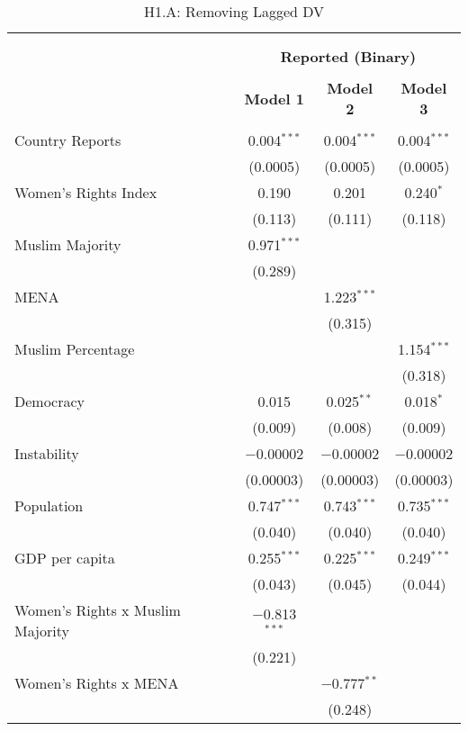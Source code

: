 
\begin{table}[!htbp] \centering 
  \caption{H1.A: Removing Lagged DV} 
  \label{} 
\begin{tabular}{@{\extracolsep{5pt}}lccc} 
\\[-1.8ex]\hline \\[-1.8ex] 
\\[-1.8ex] & \multicolumn{3}{c}{\textbf{Reported (Binary)}} \\ 
\\[-1.8ex] & \textbf{Model 1} & \textbf{Model 2} & \textbf{Model 3}\\ 
\hline \\[-1.8ex] 
 Country Reports & 0.004$^{***}$ & 0.004$^{***}$ & 0.004$^{***}$ \\ 
  & (0.0005) & (0.0005) & (0.0005) \\ 
  Women's Rights Index & 0.190 & 0.201 & 0.240$^{*}$ \\ 
  & (0.113) & (0.111) & (0.118) \\ 
  Muslim Majority & 0.971$^{***}$ &  &  \\ 
  & (0.289) &  &  \\ 
  MENA &  & 1.223$^{***}$ &  \\ 
  &  & (0.315) &  \\ 
  Muslim Percentage &  &  & 1.154$^{***}$ \\ 
  &  &  & (0.318) \\ 
  Democracy & 0.015 & 0.025$^{**}$ & 0.018$^{*}$ \\ 
  & (0.009) & (0.008) & (0.009) \\ 
  Instability & $-$0.00002 & $-$0.00002 & $-$0.00002 \\ 
  & (0.00003) & (0.00003) & (0.00003) \\ 
  Population & 0.747$^{***}$ & 0.743$^{***}$ & 0.735$^{***}$ \\ 
  & (0.040) & (0.040) & (0.040) \\ 
  GDP per capita & 0.255$^{***}$ & 0.225$^{***}$ & 0.249$^{***}$ \\ 
  & (0.043) & (0.045) & (0.044) \\ 
  Women's Rights x Muslim Majority & $-$0.813$^{***}$ &  &  \\ 
  & (0.221) &  &  \\ 
  Women's Rights x MENA &  & $-$0.777$^{**}$ &  \\ 
  &  & (0.248) &  \\ 

\end{tabular}
\end{table}

